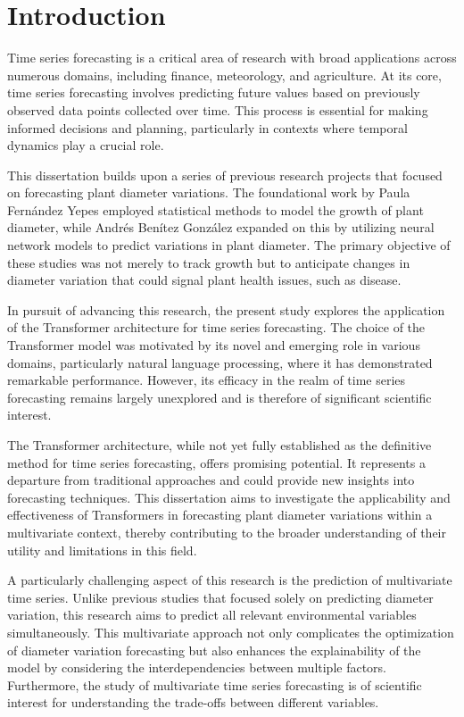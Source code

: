 \chapter{Introduction}
\pagestyle{esitscCD}

Time series forecasting is a critical area of research with broad applications across numerous domains, including finance, meteorology, and agriculture. At its core, time series forecasting involves predicting future values based on previously observed data points collected over time. This process is essential for making informed decisions and planning, particularly in contexts where temporal dynamics play a crucial role.

This dissertation builds upon a series of previous research projects that focused on forecasting plant diameter variations. The foundational work by Paula Fernández Yepes\cite{FernandezYepes2022} employed statistical methods to model the growth of plant diameter, while Andrés Benítez González\cite{BenitezGonzalez2023} expanded on this by utilizing neural network models to predict variations in plant diameter. The primary objective of these studies was not merely to track growth but to anticipate changes in diameter variation that could signal plant health issues, such as disease.

In pursuit of advancing this research, the present study explores the application of the Transformer architecture for time series forecasting. The choice of the Transformer model was motivated by its novel and emerging role in various domains, particularly natural language processing, where it has demonstrated remarkable performance. However, its efficacy in the realm of time series forecasting remains largely unexplored and is therefore of significant scientific interest.

The Transformer architecture, while not yet fully established as the definitive method for time series forecasting, offers promising potential. It represents a departure from traditional approaches and could provide new insights into forecasting techniques. This dissertation aims to investigate the applicability and effectiveness of Transformers in forecasting plant diameter variations within a multivariate context, thereby contributing to the broader understanding of their utility and limitations in this field.

A particularly challenging aspect of this research is the prediction of multivariate time series. Unlike previous studies that focused solely on predicting diameter variation, this research aims to predict all relevant environmental variables simultaneously. This multivariate approach not only complicates the optimization of diameter variation forecasting but also enhances the explainability of the model by considering the interdependencies between multiple factors. Furthermore, the study of multivariate time series forecasting is of scientific interest for understanding the trade-offs between different variables.

